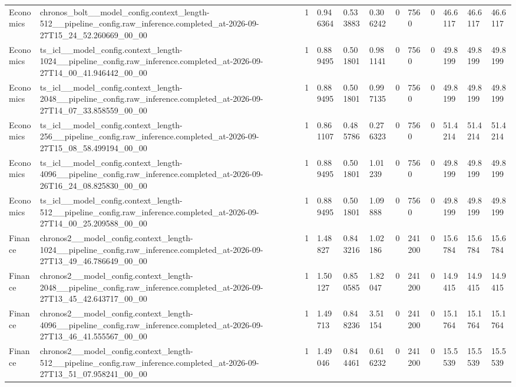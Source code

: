 \begin{tabular}{llllllllllll}
Economics & chronos\_bolt\_\_model\_config.context\_length-512\_\_pipeline\_config.raw\_inference.completed\_at-2026-09-27T15\_24\_52.260669\_00\_00 & 1 & 0.946364 & 0.533883 & 0.306242 & 0 & 7560 & 0 & 46.6117 & 46.6117 & 46.6117 \\
Economics & ts\_icl\_\_model\_config.context\_length-1024\_\_pipeline\_config.raw\_inference.completed\_at-2026-09-27T14\_00\_41.946442\_00\_00 & 1 & 0.889495 & 0.501801 & 0.981141 & 0 & 7560 & 0 & 49.8199 & 49.8199 & 49.8199 \\
Economics & ts\_icl\_\_model\_config.context\_length-2048\_\_pipeline\_config.raw\_inference.completed\_at-2026-09-27T14\_07\_33.858559\_00\_00 & 1 & 0.889495 & 0.501801 & 0.997135 & 0 & 7560 & 0 & 49.8199 & 49.8199 & 49.8199 \\
Economics & ts\_icl\_\_model\_config.context\_length-256\_\_pipeline\_config.raw\_inference.completed\_at-2026-09-27T15\_08\_58.499194\_00\_00 & 1 & 0.861107 & 0.485786 & 0.276323 & 0 & 7560 & 0 & 51.4214 & 51.4214 & 51.4214 \\
Economics & ts\_icl\_\_model\_config.context\_length-4096\_\_pipeline\_config.raw\_inference.completed\_at-2026-09-26T16\_24\_08.825830\_00\_00 & 1 & 0.889495 & 0.501801 & 1.01239 & 0 & 7560 & 0 & 49.8199 & 49.8199 & 49.8199 \\
Economics & ts\_icl\_\_model\_config.context\_length-512\_\_pipeline\_config.raw\_inference.completed\_at-2026-09-27T14\_00\_25.209588\_00\_00 & 1 & 0.889495 & 0.501801 & 1.09888 & 0 & 7560 & 0 & 49.8199 & 49.8199 & 49.8199 \\
Finance & chronos2\_\_model\_config.context\_length-1024\_\_pipeline\_config.raw\_inference.completed\_at-2026-09-27T13\_49\_46.786649\_00\_00 & 1 & 1.48827 & 0.843216 & 1.02186 & 0 & 241200 & 0 & 15.6784 & 15.6784 & 15.6784 \\
Finance & chronos2\_\_model\_config.context\_length-2048\_\_pipeline\_config.raw\_inference.completed\_at-2026-09-27T13\_45\_42.643717\_00\_00 & 1 & 1.50127 & 0.850585 & 1.82047 & 0 & 241200 & 0 & 14.9415 & 14.9415 & 14.9415 \\
Finance & chronos2\_\_model\_config.context\_length-4096\_\_pipeline\_config.raw\_inference.completed\_at-2026-09-27T13\_46\_41.555567\_00\_00 & 1 & 1.49713 & 0.848236 & 3.51154 & 0 & 241200 & 0 & 15.1764 & 15.1764 & 15.1764 \\
Finance & chronos2\_\_model\_config.context\_length-512\_\_pipeline\_config.raw\_inference.completed\_at-2026-09-27T13\_51\_07.958241\_00\_00 & 1 & 1.49046 & 0.844461 & 0.616232 & 0 & 241200 & 0 & 15.5539 & 15.5539 & 15.5539 \\

\end{tabular}
